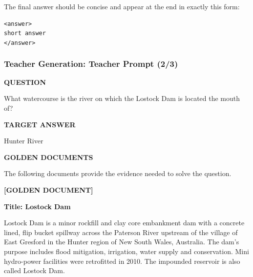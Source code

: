 \begin{frame}[t]
    \vspace{0.03cm}

    The final answer should be concise and appear at the end in
    exactly this form:

    \begin{center}
        \texttt{<answer>}\\
        \texttt{short answer}\\
        \texttt{</answer>}
    \end{center}

\end{frame}



\begin{frame}[t]
    \frametitle{Teacher Generation: Teacher Prompt (2/3)}

    \scriptsize

    \textbf{QUESTION}

    \vspace{0.04cm}

    What watercourse is the river on which the Lostock Dam is located
    the mouth of?

    \vspace{0.1cm}

    \textbf{TARGET ANSWER}

    \vspace{0.03cm}

    Hunter River

    \vspace{0.1cm}

    \textbf{GOLDEN DOCUMENTS}

    \vspace{0.03cm}

    The following documents provide the evidence needed
    to solve the question.

    \vspace{0.06cm}

    \textbf{[GOLDEN DOCUMENT]}

    \textbf{Title: Lostock Dam}

    Lostock Dam is a minor rockfill and clay core embankment dam with
    a concrete lined, flip bucket spillway across the Paterson River
    upstream of the village of East Gresford in the Hunter region of
    New South Wales, Australia. The dam's purpose includes flood
    mitigation, irrigation, water supply and conservation. Mini
    hydro-power facilities were retrofitted in 2010. The impounded
    reservoir is also called Lostock Dam.


\end{frame}
